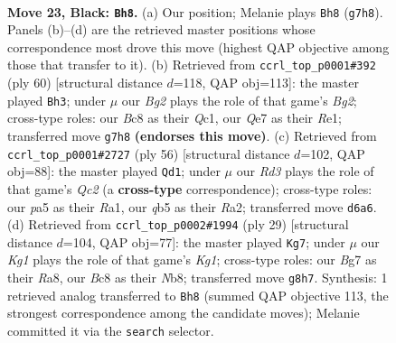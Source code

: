 \documentclass[11pt]{article}
\begin{document}
\clearpage

\begin{figure}[p]\centering
\begin{subfigure}{0.46\textwidth}\centering
\resizebox{\linewidth}{!}{%
\newchessgame
\chessboard[
  setfen={rnb3k1/pp2qpb1/3rpnp1/PQ1p3p/3P3P/1B2BNP1/RPP2P2/1N2R1K1 b - - 0 23},
  showmover=false,
  pgfstyle=straightmove, color=movearrow, markmove={g7-h8}
]}
\caption{}
\end{subfigure}\hfill
\begin{subfigure}{0.46\textwidth}\centering
\resizebox{\linewidth}{!}{%
\newchessgame
\chessboard[
  setfen={b2r2k1/p1r2p2/Pp1nqbpp/1P1p4/2pP3P/2N1PNP1/1R3PBK/2Q1R3 w - - 3 31},
  showmover=false,
  pgfstyle=straightmove, color=movearrow, markmove={g2-h3}
]}
\caption{}
\end{subfigure}
\\[4pt]
\begin{subfigure}{0.46\textwidth}\centering
\resizebox{\linewidth}{!}{%
\newchessgame
\chessboard[
  setfen={rr2bbk1/2q2pp1/3p1n1p/p2Pp3/1pP1P3/1P2B2P/RNQN1PPK/R7 w - - 8 29},
  showmover=false,
  pgfstyle=straightmove, color=movearrow, markmove={c2-d1}
]}
\caption{}
\end{subfigure}\hfill
\begin{subfigure}{0.46\textwidth}\centering
\resizebox{\linewidth}{!}{%
\newchessgame
\chessboard[
  setfen={rn3rk1/1bq2p2/p1p1pp1p/1p6/P1pPQ3/2P1PN2/5PPP/R2BK2R b KQ - 3 15},
  showmover=false,
  pgfstyle=straightmove, color=movearrow, markmove={g8-g7}
]}
\caption{}
\end{subfigure}
\caption{\textbf{Move 23, Black: \texttt{Bh8}.} (a) Our position; Melanie plays \texttt{Bh8} (\texttt{g7h8}). Panels (b)--(d) are the retrieved master positions whose correspondence most drove this move (highest QAP objective among those that transfer to it). (b) Retrieved from \texttt{ccrl\_top\_p0001\#392} (ply 60) [structural distance $d$=118, QAP obj=113]: the master played \texttt{Bh3}; under $\mu$ our \emph{Bg2} plays the role of that game's \emph{Bg2}; cross-type roles: our \emph{B}c8 as their \emph{Q}c1, our \emph{Q}e7 as their \emph{R}e1; transferred move \texttt{g7h8} \textbf{(endorses this move)}. (c) Retrieved from \texttt{ccrl\_top\_p0001\#2727} (ply 56) [structural distance $d$=102, QAP obj=88]: the master played \texttt{Qd1}; under $\mu$ our \emph{Rd3} plays the role of that game's \emph{Qc2} (a \textbf{cross-type} correspondence); cross-type roles: our \emph{p}a5 as their \emph{R}a1, our \emph{q}b5 as their \emph{R}a2; transferred move \texttt{d6a6}. (d) Retrieved from \texttt{ccrl\_top\_p0002\#1994} (ply 29) [structural distance $d$=104, QAP obj=77]: the master played \texttt{Kg7}; under $\mu$ our \emph{Kg1} plays the role of that game's \emph{Kg1}; cross-type roles: our \emph{B}g7 as their \emph{R}a8, our \emph{B}c8 as their \emph{N}b8; transferred move \texttt{g8h7}. Synthesis: 1 retrieved analog transferred to \texttt{Bh8} (summed QAP objective 113, the strongest correspondence among the candidate moves); Melanie committed it via the \texttt{search} selector.}
\label{fig:thought-m45}
\end{figure}
\end{document}
